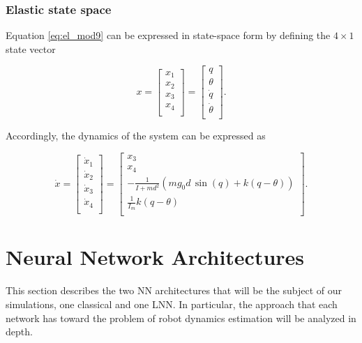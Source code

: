 \documentclass[a4paper]{article}
\begin{document}
\subsubsection{Elastic state space}
Equation \eqref{eq:el_mod9} can be expressed in state-space form by defining the $4\times1$ state vector

\begin{equation}
    \nonumber
    x = 
    \begin{bmatrix}    
        x_1 \\
        x_2 \\
        x_3 \\
        x_4 \\
    \end{bmatrix} = \begin{bmatrix}    
        q\\
        \theta\\
        \dot{q}\\
        \dot{\theta}\\
    \end{bmatrix}.
\end{equation}

Accordingly, the dynamics of the system can be expressed as

\begin{equation}
    \nonumber
    \dot{x} = 
    \begin{bmatrix}    
        \dot{x}_1 \\
        \dot{x}_2 \\
        \dot{x}_3 \\
        \dot{x}_4 \\
    \end{bmatrix} = \begin{bmatrix}    
        x_3\\
        x_4\\
        -\frac{1}{I+md^2} (mg_0d\, \sin(q) + k(q-\theta))\\
        \frac{1}{I_m} k(q-\theta)\\
    \end{bmatrix}.
\end{equation}


\section{Neural Network Architectures}
\label{sec:nn_arch}
This section describes the two NN architectures that will be the subject of our simulations, one classical and one LNN. In particular, the approach that each network has toward the problem of robot dynamics estimation will be analyzed in depth.
\end{document}
